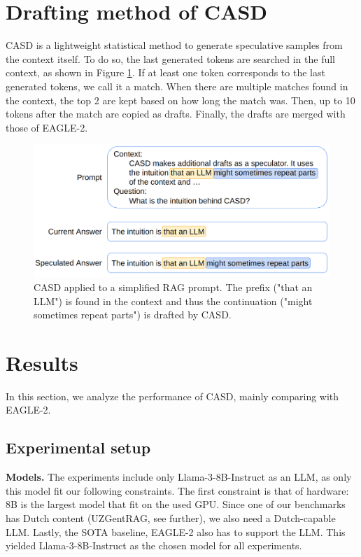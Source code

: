 \section{Drafting method of CASD}
CASD is a lightweight statistical method to generate speculative samples from the context itself. To do so, the last generated tokens are searched in the full context, as shown in Figure \ref{fig:CASD_example_prompt}. If at least one token corresponds to the last generated tokens, we call it a match. When there are multiple matches found in the context, the top 2 are kept based on how long the match was. Then, up to 10 tokens after the match are copied as drafts. Finally, the drafts are merged with those of EAGLE-2.

\begin{figure}[h]
	\centering
	\includegraphics[width=0.7\linewidth]{fig/CASD_example_prompt.png}
	\caption{CASD applied to a simplified RAG prompt. The \textcolor{orange-ish}{prefix} ("that an LLM") is found in the context and thus the \textcolor{blue-ish}{continuation} ("might sometimes repeat parts") is drafted by CASD.}
	\label{fig:CASD_example_prompt}
\end{figure}

\section{Results}
In this section, we analyze the performance of CASD, mainly comparing with EAGLE-2.

\subsection{Experimental setup}
\textbf{Models.} The experiments include only Llama-3-8B-Instruct as an LLM, as only this model fit our following constraints. The first constraint is that of hardware: 8B is the largest model that fit on the used GPU. Since one of our benchmarks has Dutch content (UZGentRAG, see further), we also need a Dutch-capable LLM. Lastly, the SOTA baseline, EAGLE-2 also has to support the LLM. This yielded Llama-3-8B-Instruct as the chosen model for all experiments. 

